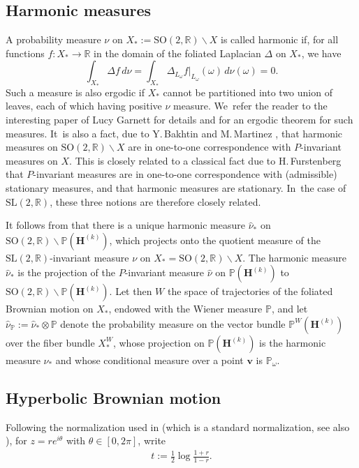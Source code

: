 \documentclass[10pt]{amsart}
\theoremstyle{plain}
\theoremstyle{definition}
\numberwithin{equation}{subsection}
\newcommand\bP{\mathbb{P}}
\newcommand\bR{\mathbb{R}}\let\R\bR
\newcommand{\SL}{\mathrm{SL}}
\newcommand{\SO}{\mathrm{SO}}
\newcommand{\bfH}{\boldsymbol{H}}
\newcommand{\bfv}{\boldsymbol{v}}
\newcommand{\defeq}{:=}
\begin{document}
\subsection{Harmonic measures}
A probability measure $\nu$ on $X_*:=\SO(2,\bR)\backslash X$ is called harmonic if, for all functions $f : X_* \to \bR$ in the domain of the foliated
Laplacian $\Delta$ on $X_*$, we have
\[
\int_{X_*} \Delta f\, d\nu= \int_{X_*} \Delta_{L_\omega} f|_{L_\omega}(\omega)\, d\nu(\omega)=0.
\]
Such a measure is also ergodic if $X_*$ cannot be partitioned into two union of leaves, each of which having positive $\nu$ measure. We~refer the reader to the interesting paper of Lucy Garnett \cite{Gar83} for details and for an ergodic theorem for such measures. It~is also a fact, due to Y.\,Bakhtin and M.\,Martinez \cite{BM08}, that harmonic measures on $\SO(2,\bR)\backslash X$ are in one-to-one correspondence with $P$-invariant measures on $X$. This is closely related to a classical fact due to H.\,Furstenberg \cite{Fur2,Fur1} that $P$-invariant measures are in one-to-one correspondence with (admissible) stationary measures, and that harmonic measures are stationary. In~the case of $\SL(2,\bR)$, these three notions are therefore closely related.

It follows from \cite{BEW20} that there is a unique harmonic
measure $\hat \nu_*$ on $\SO(2, \R) \backslash \bP(\bfH^{(k)})$, which projects onto the quotient measure of the $\SL(2,\R)$-invariant measure $\nu$ on $X_*= \SO(2, \R)\backslash X$. The harmonic measure $\hat \nu_*$ is the projection of the $P$-invariant measure $\hat \nu$ on
$\bP(\bfH^{(k)})$ to $\SO(2, \R) \backslash \bP(\bfH^{(k)})$.
Let then $W$ the space of trajectories of the foliated Brownian motion on $X_*$, endowed with the Wiener measure $\bP$, and let $\hat \nu_{\bP}\defeq \hat \nu_* \otimes \bP$ denote the probability measure on the vector bundle $\bP^W (\bfH^{(k)})$ over the fiber bundle $X_* ^W$, whose projection on $\bP(\bfH^{(k)})$ is the harmonic measure $\hat\nu_*$ and whose conditional measure over a point $\bfv$ is $\bP_\omega$.

\subsection{Hyperbolic Brownian motion}
Following the normalization used in \cite{For02} (which is a standard normalization, see also \cite{Hel00}), for $z = re^{i\theta}$ with $\theta \in [0,2\pi]$, write
\begin{align} t \defeq \frac{1}{2} \log \frac{1+r}{1-r}.
\end{align}
\end{document}
